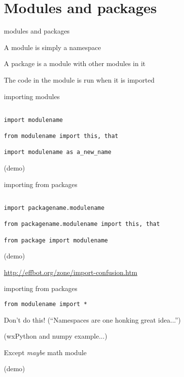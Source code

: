 \documentclass{beamer}
\begin{document}
%
%


\section{Modules and packages}

\begin{frame}{modules and packages}

{\Large A module is simply a namespace}

\vfill
{\Large A package is a module with other modules in it}

\vfill
{\Large The code in the module is run when it is imported}

\end{frame}

\begin{frame}[fragile]{importing modules}

\begin{verbatim}

import modulename

from modulename import this, that

import modulename as a_new_name
\end{verbatim}
\vfill
(demo)
\end{frame} 

\begin{frame}[fragile]{importing from packages}

\begin{verbatim}

import packagename.modulename

from packagename.modulename import this, that

from package import modulename

\end{verbatim}
\vfill
(demo)

\vfill
\url{http://effbot.org/zone/import-confusion.htm}

\end{frame} 

\begin{frame}[fragile]{importing from packages}

\begin{verbatim}
from modulename import *
\end{verbatim}

\vfill
{\LARGE Don't do this!}
\vfill
{\Large (``Namespaces are one honking great idea...'')}

\vfill
(wxPython and numpy example...)

\vfill
Except \emph{maybe} math module

\vfill
(demo)
\end{frame} 
\end{document}
